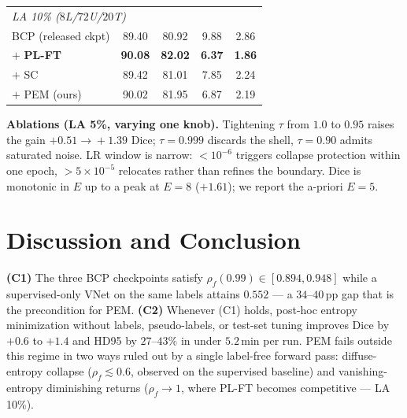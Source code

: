 \documentclass{midl}
\begin{document}
\begin{table}[htbp]
{\begin{tabular}{lcccc}
  \midrule
  \multicolumn{5}{l}{\textit{LA 10\% \;($8$L/$72$U/$20$T)}} \\
  BCP (released ckpt)         & 89.40 & 80.92 &  9.88 & 2.86 \\
  \;\;$+$ \textbf{PL-FT}      & \textbf{90.08} & \textbf{82.02} & \textbf{6.37} & \textbf{1.86} \\
  \;\;$+$ SC                  & 89.42 & 81.01 &  7.85 & 2.24 \\
  \;\;$+$ PEM (ours)          & 90.02 & 81.95 &  6.87 & 2.19 \\
  \bottomrule
  \end{tabular}}
\end{table}

\noindent\textbf{Ablations (LA 5\%, varying one knob).} Tightening $\tau$ from $1.0$ to $0.95$ raises the gain $+0.51\!\to\!+1.39$ Dice; $\tau\!=\!0.999$ discards the shell, $\tau\!=\!0.90$ admits saturated noise. LR window is narrow: $<\!10^{-6}$ triggers collapse protection within one epoch, $>\!5{\times}10^{-5}$ relocates rather than refines the boundary. Dice is monotonic in $E$ up to a peak at $E\!=\!8$ ($+1.61$); we report the a-priori $E\!=\!5$.

\section{Discussion and Conclusion}
\label{sec:conclusion}

\textbf{(C1)} The three BCP checkpoints satisfy $\rho_f(0.99)\!\in\![0.894,0.948]$ while a supervised-only VNet on the same labels attains $0.552$ --- a $34$--$40$\,pp gap that is the precondition for PEM. \textbf{(C2)} Whenever (C1) holds, post-hoc entropy minimization without labels, pseudo-labels, or test-set tuning improves Dice by $+0.6$ to $+1.4$ and HD95 by $27$--$43\%$ in under $5.2$\,min per run. PEM fails outside this regime in two ways ruled out by a single label-free forward pass: diffuse-entropy collapse ($\rho_f\!\lesssim\!0.6$, observed on the supervised baseline) and vanishing-entropy diminishing returns ($\rho_f\!\to\!1$, where PL-FT becomes competitive --- LA 10\%).


\end{document}
